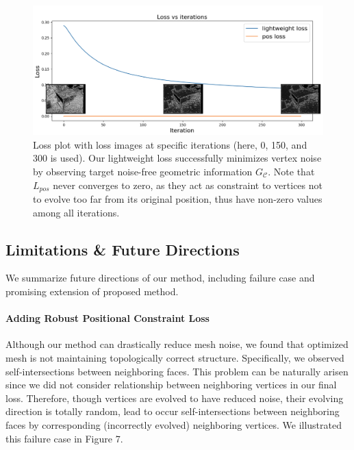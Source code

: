 \begin{figure}
    \includegraphics[width=\columnwidth]{figures/4_result_loss_plot_with_images.png}
    \caption{Loss plot with loss images at specific iterations (here, 0, 150, and 300 is used). Our lightweight loss successfully minimizes vertex noise by observing target noise-free geometric information $G_\mathcal{C}$. Note that $L_{pos}$ never converges to zero, as they act as constraint to vertices not to evolve too far from its original position, thus have non-zero values among all iterations.}
    \label{fig:loss_plot_with_images}
\end{figure}

\subsection{Limitations \& Future Directions}
We summarize future directions of our method, including failure case and promising extension of proposed method.

\paragraph{Adding Robust Positional Constraint Loss}
Although our method can drastically reduce mesh noise, we found that optimized mesh is not maintaining topologically correct structure. 
Specifically, we observed self-intersections between neighboring faces. 
This problem can be naturally arisen since we did not consider relationship between neighboring vertices in our final loss. 
Therefore, though vertices are evolved to have reduced noise, their evolving direction is totally random, lead to occur self-intersections between neighboring faces by corresponding (incorrectly evolved) neighboring vertices. 
We illustrated this failure case in Figure 7.


